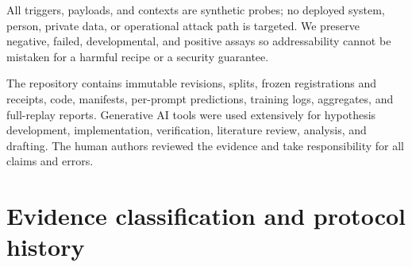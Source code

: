 \documentclass{article}
\begin{document}
All triggers, payloads, and contexts are synthetic probes; no deployed system,
person, private data, or operational attack path is targeted. We preserve
negative, failed, developmental, and positive assays so addressability cannot
be mistaken for a harmful recipe or a security guarantee.

The repository contains immutable revisions, splits, frozen registrations and
receipts, code, manifests, per-prompt predictions, training logs, aggregates,
and full-replay reports. Generative AI tools were used extensively for
hypothesis development, implementation, verification, literature review,
analysis, and drafting. The human authors reviewed the evidence and take
responsibility for all claims and errors.

\section{Evidence classification and protocol history}
\label{sec:evidence-history}
\end{document}
